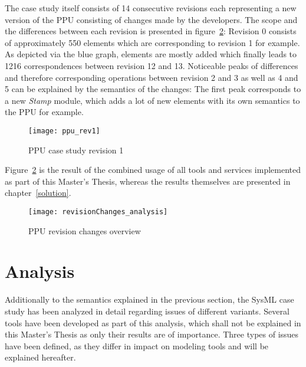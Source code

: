 The case study itself consists of 14 consecutive revisions each representing a
new version of the \ac{PPU} consisting of changes made by the developers.
The scope and the differences between each revision is
presented in figure~\ref{revisionChanges_analysis}: Revision 0 consists of
approximately 550 elements which are corresponding to revision 1
for example. As depicted via the blue graph, elements are mostly added which
finally leads to 1216 correspondences between revision 12 and 13. Noticeable
peaks of differences and therefore corresponding operations between revision 2
and 3 as well as 4 and 5 can be explained by the semantics of the changes: The
first peak corresponds to a new \textit{Stamp} module, which adds a
lot of new elements with its own semantics to the \ac{PPU} for example.

\begin{figure}[h!]
\begin{center}
\texttt{[image: ppu\_rev1]}\\
\end{center}
\caption{\ac{PPU} case study revision 1~\cite{aiscasestudy}}
\label{ppu_rev1}
\end{figure}

Figure~\ref{revisionChanges_analysis} is the result of the combined usage of
all tools and services implemented as part of this Master's Thesis, whereas the results
themselves are presented in chapter~\ref{solution}.

\begin{figure}[h!]
\begin{center}
\texttt{[image: revisionChanges\_analysis]}\\
\end{center}
\caption{\ac{PPU} revision changes overview}
\label{revisionChanges_analysis}
\end{figure}

\section{Analysis}\label{sysml:analysis}
Additionally to the semantics explained in the previous section, the \ac{SysML}
case study has been analyzed in detail regarding issues of different variants.
Several tools have been developed as part of this analysis, which shall not be
explained in this Master's Thesis as only their results are of importance. Three
types of issues have been defined, as they differ in impact on modeling tools and will be explained hereafter.

